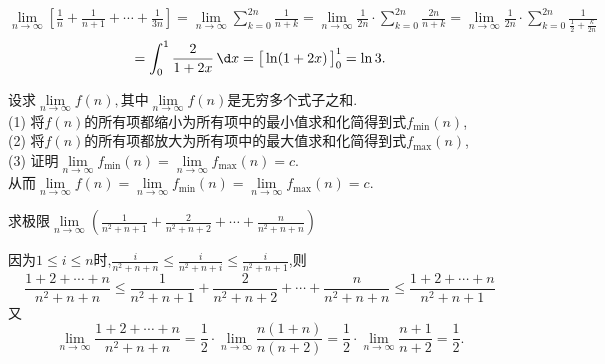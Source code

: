 \solve 
$
\displaystyle
\lim\limits_{n \to \infty}\left[ \frac 1n +\frac {1}{n+1}+\cdots+\frac{1}{3n}\right] 
=\lim\limits_{n \to \infty}\sum_{k=0}^{2n}\frac{1}{n+k}
=\lim\limits_{n \to \infty}\frac{1}{2n}\cdot \sum_{k=0}^{2n}\frac{2n}{n+k}
=\lim\limits_{n \to \infty}\frac{1}{2n}\cdot \sum_{k=0}^{2n}\frac{1}{\frac{1}{2}+\frac{k}{2n}}
$
\[
=\int_{0}^{1}\frac{2}{1+2x}\,\d x=\big[\ln(1+2x)\,\big]_0^1=\ln 3.
\]

\summarize
[
\kg 本题没有给出和式表达式,需要我们自己写成和式的形式,以方便构造积分的形式.\\
\kg 本题中和式的上限不是$n$而是$2n$,那么这个时候整个积分区间就不是被等分成$n$份,而是$2n$份,因此,我们要构造关于变量$\dfrac{i}{2n}$的函数,即
\begin{equation}
	\lim\limits_{n \to \infty}\frac{1}{2n}\cdot\sum_{i=1}^{2n}f\left(\frac{i}{2n}\right)
\end{equation}
\kg 积分的上下限由变量$\frac{i}{n}$(本题$\frac{i}{2n}$)的范围所确定,如本题$i =1,2,\ldots,2n,\lim\limits_{n \to \infty}\dfrac{i}{2n}=0,1.$.因此积分的上下限是0,1.
]

\noindent \highlights[2. 夹逼定理法]

\vspace*{1em} \noindent  \hspace*{0.2em}  \hspace{1.5em}
设求$\lim\limits_{n \to \infty}f(n),$其中$\lim\limits_{n \to \infty}f(n)$是无穷多个式子之和.\\[0.5em]
(1) 将$f(n)$的所有项都缩小为所有项中的最小值求和化简得到式$f_{\min}(n)$,\\[0.3em]
(2) 将$f(n)$的所有项都放大为所有项中的最大值求和化简得到式$f_{\max}(n)$,\\[0.3em]
(3) 证明$\lim\limits_{n \to \infty}f_{\min}(n)=\lim\limits_{n \to \infty}f_{\max}(n)=c.$\\[0.5em]
从而$\lim\limits_{n \to \infty}f(n)=\lim\limits_{n \to \infty}f_{\min}(n)=\lim\limits_{n \to \infty}f_{\max}(n)=c.$

\examples 求极限$\displaystyle \lim\limits_{n \to \infty}\left(\frac{1}{n^2+n+1}+\frac{2}{n^2+n+2}+\cdots+\frac{n}{n^2+n+n}\right)$

\solve 因为$1 \le i \le n$时,$\displaystyle \frac{i}{n^2+n+n}\le\frac{i}{n^2+n+i}\le \frac{i}{n^2+n+1}$,则
\[
\frac{1+2+\cdots+n}{n^2+n+n}\le \frac{1}{n^2+n+1}+\frac{2}{n^2+n+2}+\cdots+\frac{n}{n^2+n+n} \le \frac{1+2+\cdots+n}{n^2+n+1}
\]
又
\[
\lim\limits_{n \to \infty}\frac{1+2+\cdots +n}{n^2+n+n}=\frac 12 \cdot \lim\limits_{n \to \infty}\frac{n(1+n)}{n(n+2)}=\frac 12 \cdot \lim\limits_{n \to \infty}\frac{n+1}{n+2}=\frac{1}{2}.
\]


